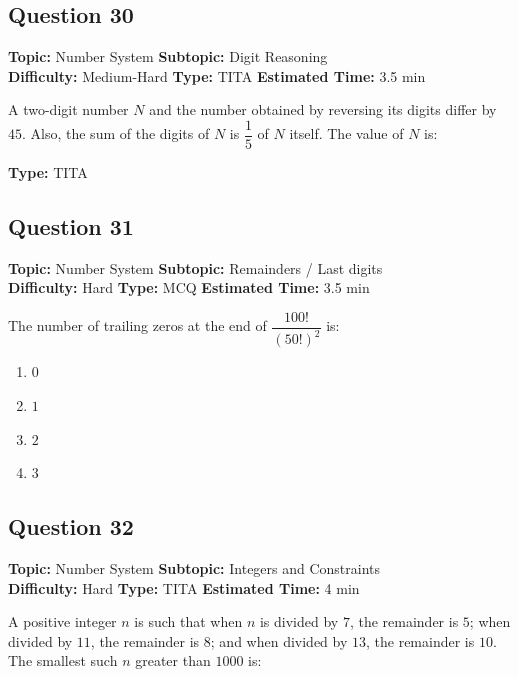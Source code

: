 \documentclass[11pt]{article}
\begin{document}
\subsection*{Question 30}
\textbf{Topic:} Number System \quad \textbf{Subtopic:} Digit Reasoning \\
\textbf{Difficulty:} Medium-Hard \quad \textbf{Type:} TITA \quad \textbf{Estimated Time:} 3.5 min

\begin{tcolorbox}
A two-digit number \(N\) and the number obtained by reversing its digits differ by \(45\). Also, the sum of the digits of \(N\) is \(\dfrac{1}{5}\) of \(N\) itself. The value of \(N\) is:
\end{tcolorbox}

\textbf{Type:} TITA

\subsection*{Question 31}
\textbf{Topic:} Number System \quad \textbf{Subtopic:} Remainders / Last digits \\
\textbf{Difficulty:} Hard \quad \textbf{Type:} MCQ \quad \textbf{Estimated Time:} 3.5 min

\begin{tcolorbox}
The number of trailing zeros at the end of \(\dfrac{100!}{(50!)^2}\) is:
\end{tcolorbox}

\begin{enumerate}[label=(\Alph*)]
    \item \(0\)
    \item \(1\)
    \item \(2\)
    \item \(3\)
\end{enumerate}

\subsection*{Question 32}
\textbf{Topic:} Number System \quad \textbf{Subtopic:} Integers and Constraints \\
\textbf{Difficulty:} Hard \quad \textbf{Type:} TITA \quad \textbf{Estimated Time:} 4 min

\begin{tcolorbox}
A positive integer \(n\) is such that when \(n\) is divided by \(7\), the remainder is \(5\); when divided by \(11\), the remainder is \(8\); and when divided by \(13\), the remainder is \(10\). The smallest such \(n\) greater than \(1000\) is:
\end{tcolorbox}
\end{document}
